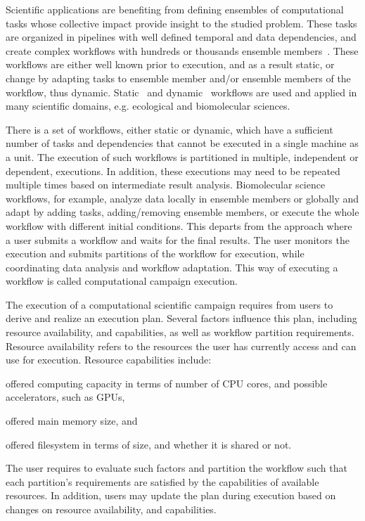 Scientific applications are benefiting from defining ensembles of computational 
tasks whose collective impact provide insight to the studied problem. These 
tasks are organized in pipelines with well defined temporal and data 
dependencies, and create complex workflows with hundreds or thousands ensemble 
members~\cite{malawski2015algorithms,rietmann2012forward,dakka2018high}. These 
workflows are either well known prior to execution, and as a result static, or
change by adapting tasks to ensemble member and/or ensemble members of the 
workflow, thus dynamic. Static~\cite{paraskevakos2019workflow} and 
dynamic~\cite{dakka2018high} workflows are used and applied in many scientific
domains, e.g. ecological and biomolecular sciences. 

There is a set of workflows, either static or dynamic, which have a sufficient 
number of tasks and dependencies that cannot be executed in a single machine as 
a unit. The execution of such workflows is partitioned in multiple, independent 
or dependent, executions. In addition, these executions may need to be repeated 
multiple times based on intermediate result analysis. Biomolecular science 
workflows, for example, analyze data locally in ensemble members or globally and 
adapt by adding tasks, adding/removing ensemble members, or execute the whole 
workflow with different initial conditions. This departs from the approach where 
a user submits a workflow and waits for the final results. The user monitors 
the execution and submits partitions of the workflow for execution, while 
coordinating data analysis and workflow adaptation. This way of executing a 
workflow is called computational campaign execution.

The execution of a computational scientific campaign requires from users to 
derive and realize an execution plan. Several factors influence this plan, 
including resource availability, and capabilities, as well as workflow partition 
requirements. Resource availability refers to the resources the user has 
currently access and can use for execution. Resource capabilities include: 
\begin{inparaenum}[1)]
\item offered computing capacity in terms of number of CPU cores, and possible 
      accelerators, such as GPUs,
\item offered main memory size, and
\item offered filesystem in terms of size, and whether it is shared or not.
\end{inparaenum} The user requires to evaluate such factors and partition the 
workflow such that each partition's requirements are satisfied by the 
capabilities of available resources. In addition, users may update the plan 
during execution based on changes on resource availability, and capabilities.

